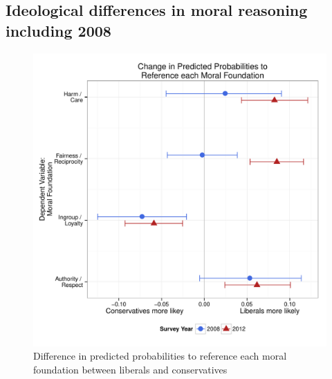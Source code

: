 \documentclass[12pt]{article}
\begin{document}
\subsection{Ideological differences in moral reasoning including 2008}

\begin{figure}\centering
\includegraphics[scale=.4]{../calc/fig/appD1ideol.pdf}
\caption{Difference in predicted probabilities to reference each moral foundation between liberals and conservatives}\label{fig:appD1ideol}
\end{figure}
\end{document}
